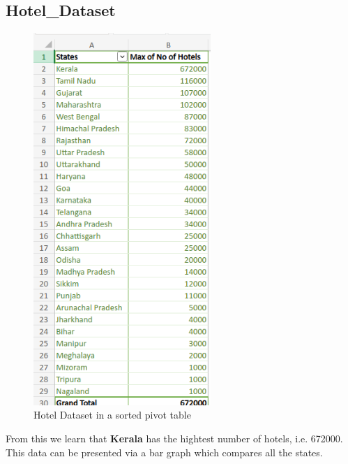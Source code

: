 \documentclass{report}
\begin{document}
\subsection{Hotel\_Dataset}
\begin{Center}
  \begin{figure}[h!]
    \includegraphics[width=0.6\textwidth]{Hotel_Dataset.png}
    \caption{Hotel Dataset in a sorted pivot table}
   \end{figure}
 \end{Center}
 From this we learn that \textbf{Kerala} has the hightest number of hotels, i.e. 672000.
\newpage
This data can be presented via a bar graph which compares all the states.
\end{document}
